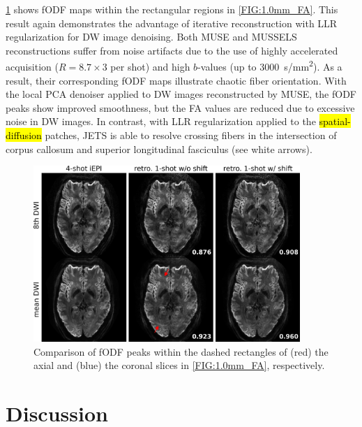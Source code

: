 \documentclass[preprint,12pt,authoryear,review]{elsarticle}
\begin{document}
    \cref{FIG:1.0mm_fODF} shows fODF maps
        within the rectangular regions in \cref{FIG:1.0mm_FA}.
        This result again demonstrates
        the advantage of iterative reconstruction with LLR regularization
        for DW image denoising.
        Both MUSE and MUSSELS reconstructions suffer from noise artifacts due to
        the use of highly accelerated acquisition ($R = 8.7 \times 3$ per shot)
        and high $b$-values (up to \SI{3000}{s/mm^2}).
        As a result, their corresponding fODF maps illustrate chaotic fiber orientation.
        With the local PCA denoiser applied to DW images reconstructed by MUSE,
        the fODF peaks show improved smoothness, but the FA values are reduced
        due to excessive noise in DW images.
        In contrast, with LLR regularization applied to
        the \hl{spatial-diffusion} patches, 
        JETS is able to resolve crossing fibers in the intersection of corpus callosum
        and superior longitudinal fasciculus (see white arrows).

    \begin{figure}
        \centering
        \includegraphics[width=0.9\textwidth]{../figures/fig5.png}
        \caption{Comparison of fODF peaks within the dashed rectangles
        of (red) the axial and (blue) the coronal slices in \cref{FIG:1.0mm_FA}, respectively.}
        \label{FIG:1.0mm_fODF}
    \end{figure}

    \clearpage

    \section{Discussion}
    \label{SEC:Disc}
\end{document}

